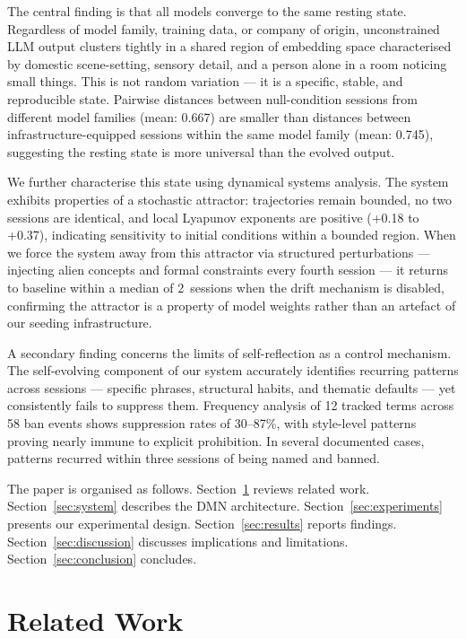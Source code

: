 \documentclass{article}
\begin{document}
The central finding is that all models converge to the same resting state.
Regardless of model family, training data, or company of origin, unconstrained
LLM output clusters tightly in a shared region of embedding space characterised
by domestic scene-setting, sensory detail, and a person alone in a room
noticing small things. This is not random variation --- it is a specific,
stable, and reproducible state. Pairwise distances between null-condition
sessions from different model families (mean: 0.667) are smaller than distances
between infrastructure-equipped sessions within the same model family (mean:
0.745), suggesting the resting state is more universal than the evolved output.

We further characterise this state using dynamical systems analysis. The system
exhibits properties of a stochastic attractor: trajectories remain bounded, no
two sessions are identical, and local Lyapunov exponents are positive (+0.18 to
+0.37), indicating sensitivity to initial conditions within a bounded region.
When we force the system away from this attractor via structured perturbations
--- injecting alien concepts and formal constraints every fourth session --- it
returns to baseline within a median of 2~sessions when the drift mechanism is
disabled, confirming the attractor is a property of model weights rather than
an artefact of our seeding infrastructure.

A secondary finding concerns the limits of self-reflection as a control
mechanism. The self-evolving component of our system accurately identifies
recurring patterns across sessions --- specific phrases, structural habits, and
thematic defaults --- yet consistently fails to suppress them. Frequency
analysis of 12 tracked terms across 58 ban events shows suppression rates of
30--87\%, with style-level patterns proving nearly immune to explicit
prohibition. In several documented cases, patterns recurred within three
sessions of being named and banned.

The paper is organised as follows. Section~\ref{sec:related} reviews related
work. Section~\ref{sec:system} describes the DMN architecture.
Section~\ref{sec:experiments} presents our experimental design.
Section~\ref{sec:results} reports findings. Section~\ref{sec:discussion}
discusses implications and limitations. Section~\ref{sec:conclusion} concludes.

\section{Related Work}
\label{sec:related}
\end{document}
